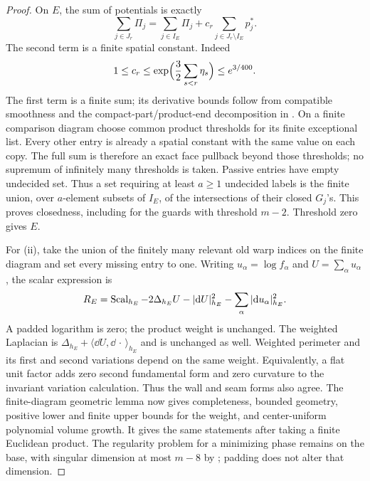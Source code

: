 \begin{proof}
On $E$, the sum of potentials is exactly
\begin{equation}\label{countable:potential-sum}
 \sum_{j\in J_r}\Pi_j
 =\sum_{j\in I_E}\Pi_j+c_r\sum_{j\in J_r\setminus I_E}p_j^*.
\end{equation}
The second term is a finite spatial constant. Indeed
\[
 1\le c_r\le\exp\Bigl(\frac32\sum_{s<r}\eta_s\Bigr)
 \le e^{3/400}.
\]
The first term is a finite sum; its derivative bounds follow from
compatible smoothness and the compact-part/product-end decomposition
in . On a finite comparison diagram choose common
product thresholds for its finite exceptional list. Every other entry is already a spatial
constant with the same value on each copy. The full sum is therefore
an exact face pullback beyond those thresholds; no supremum of
infinitely many thresholds is taken. Passive entries have empty
undecided set. Thus a set requiring at least $a\ge1$ undecided labels
is the finite union, over $a$-element subsets of $I_E$, of the intersections of
their closed $G_j$'s. This proves closedness, including for the guards
with threshold $m-2$. Threshold zero gives $E$.

For (ii), take the union of the finitely many relevant old warp
indices on the finite diagram and set every missing entry to one.
Writing $u_\alpha=\log f_\alpha$ and $U=\sum_\alpha u_\alpha$, the
scalar expression is
\[
 R_E=\operatorname{Scal}_{h_E}-2\Delta_{h_E}U-|\mathrm d U|_{h_E}^2
                        -\sum_\alpha|\mathrm d u_\alpha|_{h_E}^2.
\]
A padded logarithm is zero; the product weight is unchanged. The
weighted Laplacian is
$\Delta_{h_E}+\langle\dd U,\dd\,\cdot\,\rangle_{h_E}$ and is
unchanged as well. Weighted perimeter and its first and second
variations depend on the same weight. Equivalently, a flat unit
factor adds zero second fundamental form and zero curvature to the
invariant variation calculation. Thus the wall and seam forms also
agree. The finite-diagram geometric lemma now gives completeness,
bounded geometry, positive lower and finite upper bounds for the
weight, and center-uniform polynomial volume growth. It gives the
same statements after taking a finite Euclidean product. The
regularity problem for a minimizing phase remains on the base, with
singular dimension at most $m-8$ by ; padding does not
alter that dimension.


\end{proof}
